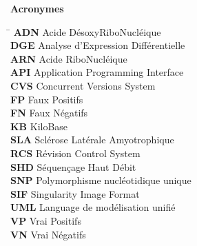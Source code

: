\begin{paracol}{2} %
    \begin{center}
    \textbf{Acronymes}
    \end{center}
\begin{tabbing}
    \hspace{2cm} \= \kill %
    \textbf{\textsc{ADN}} \> Acide DésoxyRiboNucléique \\
    \textbf{\textsc{DGE}} \> Analyse d'Expression Différentielle\\
    \textbf{\textsc{ARN}} \> Acide RiboNucléique \\
    \textbf{\textsc{API}} \> Application Programming Interface \\
    \textbf{\textsc{CVS}} \> Concurrent Versions System \\
    \textbf{\textsc{FP}} \> Faux Positifs \\
    \textbf{\textsc{FN}} \> Faux Négatifs \\
    \textbf{\textsc{KB}} \> KiloBase \\
    \textbf{\textsc{SLA}} \> Sclérose Latérale Amyotrophique \\
    \textbf{\textsc{RCS}} \> Révision Control System \\
    \textbf{\textsc{SHD}} \> Séquençage Haut Débit \\
    \textbf{\textsc{SNP}} \> Polymorphisme nucléotidique unique \\
    \textbf{\textsc{SIF}} \> Singularity Image Format \\
    \textbf{\textsc{UML}} \> Language de modélisation unifié\\
    \textbf{\textsc{VP}} \> Vrai Positifs \\
    \textbf{\textsc{VN}} \> Vrai Négatifs \\
 

\end{tabbing}
\end{paracol}

